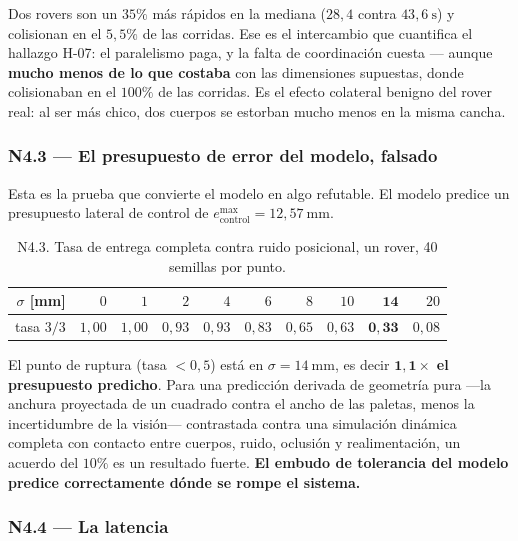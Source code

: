 \documentclass[11pt,a4paper]{article}
\begin{document}
Dos rovers son un $35\%$ más rápidos en la mediana ($28{,}4$ contra $43{,}6\ \mathrm{s}$)
y colisionan en el $5{,}5\%$ de las corridas. Ese es el intercambio que cuantifica el
hallazgo H-07: el paralelismo paga, y la falta de coordinación cuesta --- aunque
\textbf{mucho menos de lo que costaba} con las dimensiones supuestas, donde colisionaban
en el $100\%$ de las corridas. Es el efecto colateral benigno del rover real: al ser más
chico, dos cuerpos se estorban mucho menos en la misma cancha.

\subsubsection{N4.3 --- El presupuesto de error del modelo, falsado}

Esta es la prueba que convierte el modelo en algo refutable. El modelo predice un
presupuesto lateral de control de $e^{\max}_{\mathrm{control}} = 12{,}57\ \mathrm{mm}$.

\begin{table}[htbp]
\centering
\small
\caption{N4.3. Tasa de entrega completa contra ruido posicional, un rover,
40 semillas por punto.}
\begin{tabular}{rrrrrrrrrr}
\toprule
$\sigma$ [mm] & $0$ & $1$ & $2$ & $4$ & $6$ & $8$ & $10$ & $\mathbf{14}$ & $20$ \\
\midrule
tasa $3/3$ & $1{,}00$ & $1{,}00$ & $0{,}93$ & $0{,}93$ & $0{,}83$ & $0{,}65$ & $0{,}63$ &
$\mathbf{0{,}33}$ & $0{,}08$ \\
\bottomrule
\end{tabular}
\end{table}

El punto de ruptura (tasa $<0{,}5$) está en $\sigma = 14\ \mathrm{mm}$, es decir
$\mathbf{1{,}1\times}$ \textbf{el presupuesto predicho}. Para una predicción derivada de
geometría pura ---la anchura proyectada de un cuadrado contra el ancho de las paletas,
menos la incertidumbre de la visión--- contrastada contra una simulación dinámica
completa con contacto entre cuerpos, ruido, oclusión y realimentación, un acuerdo del
$10\%$ es un resultado fuerte. \textbf{El embudo de tolerancia del modelo predice
correctamente dónde se rompe el sistema.}

\subsubsection{N4.4 --- La latencia}
\end{document}
